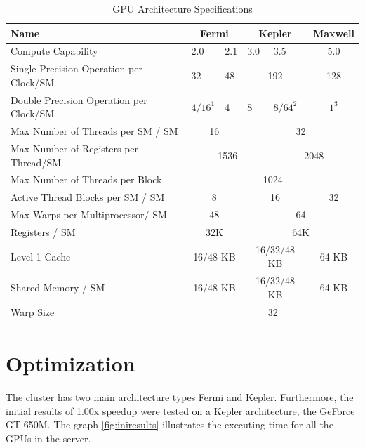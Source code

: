 \begin{table}[h]
\centering
  \begin{tabular} { | l | l  | l | l | l  |  l  | l |}
    \hline
    Name & \multicolumn{2}{|c|}{Fermi} & \multicolumn{2}{|c|}{Kepler} &  \multicolumn{2}{|c|}{Maxwell} \\
    \hline
    Compute Capability & 2.0 & 2.1 & 3.0 & 3.5 & \multicolumn{2}{|c|}{5.0}\\
   \hline
    Single Precision Operation per Clock/SM & 32 & 48 & \multicolumn{2}{|c|}{192} & \multicolumn{2}{|c|}{128}\\
   \hline
    Double Precision Operation per Clock/SM & $4/16^1$ & 4 & 8 & $8/64^2$ & \multicolumn{2}{|c|}{$1^3$}\\
   \hline
    Max Number of Threads per SM / SM & \multicolumn{2}{|c|}{16} & \multicolumn{4}{|c|}{32}\\
   \hline
    Max Number of Registers per Thread/SM & \multicolumn{3}{|c|}{1536} & \multicolumn{3}{|c|}{2048}\\
   \hline
       Max Number of Threads per Block & \multicolumn{6}{|c|}{1024}\\
   \hline
   Active Thread Blocks per SM / SM & \multicolumn{2}{|c|}{8} & \multicolumn{2}{|c|}{16} & \multicolumn{2}{|c|}{32}\\
   \hline
   Max Warps per Multiprocessor/ SM & \multicolumn{2}{|c|}{48} & \multicolumn{4}{|c|}{64}\\
   \hline
   Registers / SM & \multicolumn{2}{|c|}{32K} & \multicolumn{4}{|c|}{64K}\\
   \hline
   Level 1 Cache & \multicolumn{2}{|c|}{16/48 KB} & \multicolumn{2}{|c|}{16/32/48 KB} & \multicolumn{2}{|c|}{64 KB}\\
   \hline
   Shared Memory / SM & \multicolumn{2}{|c|}{16/48 KB} & \multicolumn{2}{|c|}{16/32/48 KB} & \multicolumn{2}{|c|}{64 KB}\\
   \hline
   Warp Size & \multicolumn{6}{c|}{32}  \\
   \hline
  \end{tabular}
  \caption{GPU Architecture Specifications}
  \label{tab:arch}
  \end{table}
 
\section{Optimization}

The cluster has two  main architecture types Fermi and Kepler. Furthermore, the initial results of 1.00x speedup were tested on a Kepler architecture, the GeForce GT 650M. The graph \ref{fig:iniresults} illustrates the executing time for all the GPUs in the server.

